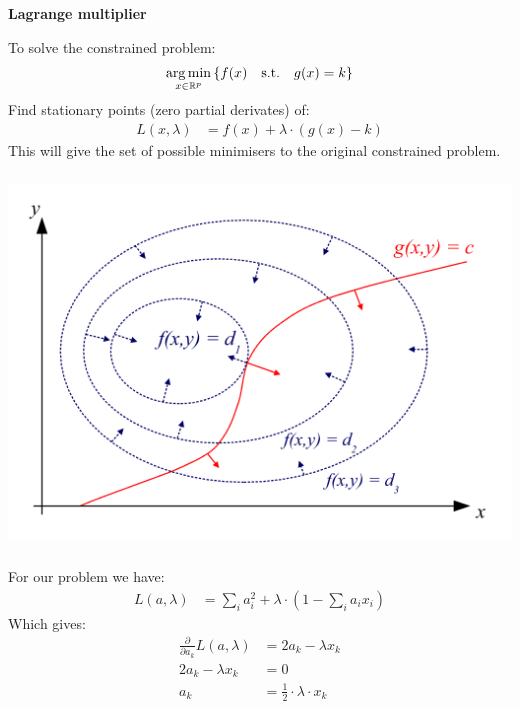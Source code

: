 \begin{frame}[fragile] \frametitle{}

{\bf Lagrange multiplier}

To solve the constrained problem:
\begin{align*}
\mathop{\mathrm{arg\,min}}_{x \in \mathbb{R}^p} \left\{ f(x) \quad \text{s.t.} \quad g(x) = k \right\}
\end{align*}
Find stationary points (zero partial derivates) of:
\begin{align*}
L(x,\lambda) &= f(x) + \lambda \cdot (g(x) - k)
\end{align*}
This will give the set of possible minimisers to the original constrained
problem.

\end{frame}

\begin{frame}[fragile] \frametitle{}

\begin{center}
\includegraphics[width=0.95\linewidth]{img/LagrangeMultipliers2D.svg.png}
\end{center}

\end{frame}

\begin{frame}[fragile] \frametitle{}

For our problem we have:
\begin{align*}
L(a,\lambda) &= \sum_i a_i^2 + \lambda \cdot \left( 1 - \sum_i a_i x_i\right)
\end{align*}
\pause  Which gives:
\begin{align*}
\frac{\partial}{\partial a_k}  L(a,\lambda) &= 2 a_k - \lambda x_k \\
2 a_k - \lambda x_k &= 0 \\
a_k &= \frac{1}{2} \cdot \lambda \cdot x_k
\end{align*}

\end{frame}

